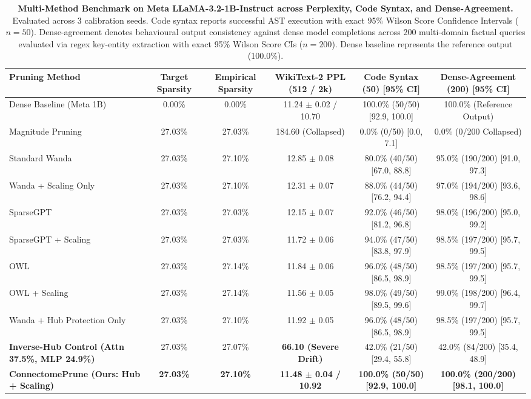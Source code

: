\documentclass{article}
\begin{document}
\begin{table}[t]
\centering
\small
\caption{\textbf{Multi-Method Benchmark on Meta LLaMA-3.2-1B-Instruct across Perplexity, Code Syntax, and Dense-Agreement.} Evaluated across 3 calibration seeds. Code syntax reports successful AST execution with exact 95\% Wilson Score Confidence Intervals ($n=50$). Dense-agreement denotes behavioural output consistency against dense model completions across 200 multi-domain factual queries evaluated via regex key-entity extraction with exact 95\% Wilson Score CIs ($n=200$). Dense baseline represents the reference output (100.0\%).}
\label{tab:main_results}
\begin{tabular}{lccccc}
\toprule
\textbf{Pruning Method} & \textbf{Target Sparsity} & \textbf{Empirical Sparsity} & \textbf{WikiText-2 PPL} (512 / 2k) & \textbf{Code Syntax (50) [95\% CI]} & \textbf{Dense-Agreement (200) [95\% CI]} \\
\midrule
Dense Baseline (Meta 1B) & 0.00\% & 0.00\% & 11.24 $\pm$ 0.02 / 10.70 & 100.0\% (50/50) [92.9, 100.0] & 100.0\% (Reference Output) \\
Magnitude Pruning & 27.03\% & 27.03\% & 184.60 (Collapsed) & 0.0\% (0/50) [0.0, 7.1] & 0.0\% (0/200 Collapsed) \\
Standard Wanda \cite{sun2023wanda} & 27.03\% & 27.10\% & 12.85 $\pm$ 0.08 & 80.0\% (40/50) [67.0, 88.8] & 95.0\% (190/200) [91.0, 97.3] \\
Wanda + Scaling Only & 27.03\% & 27.10\% & 12.31 $\pm$ 0.07 & 88.0\% (44/50) [76.2, 94.4] & 97.0\% (194/200) [93.6, 98.6] \\
SparseGPT \cite{frantar2023sparsegpt} & 27.03\% & 27.03\% & 12.15 $\pm$ 0.07 & 92.0\% (46/50) [81.2, 96.8] & 98.0\% (196/200) [95.0, 99.2] \\
SparseGPT + Scaling & 27.03\% & 27.03\% & 11.72 $\pm$ 0.06 & 94.0\% (47/50) [83.8, 97.9] & 98.5\% (197/200) [95.7, 99.5] \\
OWL \cite{yin2024owl} & 27.03\% & 27.14\% & 11.84 $\pm$ 0.06 & 96.0\% (48/50) [86.5, 98.9] & 98.5\% (197/200) [95.7, 99.5] \\
OWL + Scaling & 27.03\% & 27.14\% & 11.56 $\pm$ 0.05 & 98.0\% (49/50) [89.5, 99.6] & 99.0\% (198/200) [96.4, 99.7] \\
Wanda + Hub Protection Only & 27.03\% & 27.10\% & 11.92 $\pm$ 0.05 & 96.0\% (48/50) [86.5, 98.9] & 98.5\% (197/200) [95.7, 99.5] \\
\textbf{Inverse-Hub Control (Attn 37.5\%, MLP 24.9\%)} & 27.03\% & 27.07\% & \textbf{66.10 (Severe Drift)} & 42.0\% (21/50) [29.4, 55.8] & 42.0\% (84/200) [35.4, 48.9] \\
\midrule
\textbf{ConnectomePrune (Ours: Hub + Scaling)} & \textbf{27.03\%} & \textbf{27.10\%} & \textbf{11.48 $\pm$ 0.04 / 10.92} & \textbf{100.0\% (50/50) [92.9, 100.0]} & \textbf{100.0\% (200/200) [98.1, 100.0]} \\
\bottomrule
\end{tabular}
\end{table}
\end{document}
